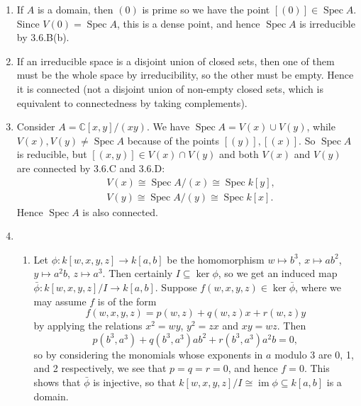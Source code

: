 \documentclass{report}
\newcommand{\induced}[1]{\bar{#1}} %
\newcommand{\C}{\mathbb{C}}
\DeclareMathOperator{\im}{im}
\DeclareMathOperator{\Spec}{Spec}
\begin{document}
\begin{enumerate}[label=\textbf{3.6.\Alph*.}]
	\item If $A$ is a domain, then $(0)$ is prime so we have the point
	      $[(0)]\in\Spec A$. Since $V(0)=\Spec A$, this is a dense point, and
	      hence $\Spec A$ is irreducible by 3.6.B(b).

	\item If an irreducible space is a disjoint union of closed sets, then one
	      of them must be the whole space by irreducibility, so the other must be
	      empty. Hence it is connected (not a disjoint union of non-empty closed
	      sets, which is equivalent to connectedness by taking complements).

	\item Consider $A=\C[x,y]/(xy)$. We have $\Spec A=V(x)\cup V(y)$, while
	      $V(x),V(y)\ne\Spec A$ because of the points $[(y)],[(x)]$. So $\Spec A$
	      is reducible, but $[(x,y)]\in V(x)\cap V(y)$ and both $V(x)$ and $V(y)$
	      are connected by 3.6.C and 3.6.D:
	      \begin{align*}
		       & V(x)\cong\Spec A/(x)\cong\Spec k[y], \\
		       & V(y)\cong\Spec A/(y)\cong\Spec k[x].
	      \end{align*}
	      Hence $\Spec A$ is also connected.

	\item
	      \begin{enumerate}[label=(\alph*)]
		      \item Let $\phi:k[w,x,y,z]\to k[a,b]$ be the homomorphism
		            $w\mapsto b^3$, $x\mapsto ab^2$, $y\mapsto a^2b$, $z\mapsto a^3$.
		            Then certainly $I\subseteq\ker\phi$, so we get an induced map
		            $\induced\phi:k[w,x,y,z]/I\to k[a,b]$. Suppose
		            $f(w,x,y,z)\in\ker\induced\phi$, where we may assume $f$ is of
		            the form
		            \begin{equation*}
			            f(w,x,y,z) = p(w,z) + q(w,z)x + r(w,z)y
		            \end{equation*}
		            by applying the relations $x^2=wy$, $y^2=zx$ and $xy=wz$. Then
		            \begin{equation*}
			            p(b^3,a^3) + q(b^3,a^3)ab^2 + r(b^3,a^3)a^2b = 0,
		            \end{equation*}
		            so by considering the monomials whose exponents in $a$ modulo 3
		            are 0, 1, and 2 respectively, we see that $p=q=r=0$, and hence
		            $f=0$. This shows that $\induced\phi$ is injective, so that
		            $k[w,x,y,z]/I\cong\im\phi\subseteq k[a,b]$ is a domain.


\end{enumerate}
\end{enumerate}
\end{document}
